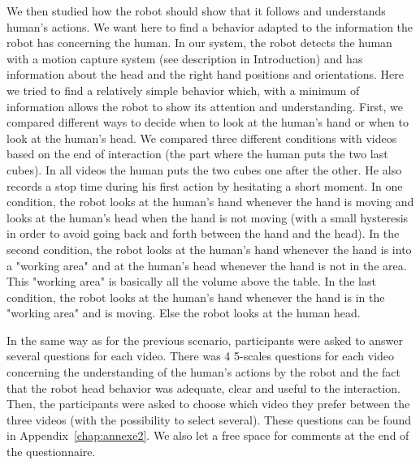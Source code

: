 \documentclass[english,a4paper,11pt,twoside]{StyleThese}
\begin{document}
We then studied how the robot should show that it follows and understands human's actions. We want here to find a behavior adapted to the information the robot has concerning the human. In our system, the robot detects the human with a motion capture system (see description in Introduction) and has information about the head and the right hand positions and orientations. Here we tried to find a relatively simple behavior which, with a minimum of information allows the robot to show its attention and understanding. First, we compared different ways to decide when to look at the human's hand or when to look at the human's head. We compared three different conditions with videos based on the end of interaction (the part where the human puts the two last cubes). In all videos the human puts the two cubes one after the other. He also records a stop time during his first action by hesitating a short moment. In one condition, the robot looks at the human's hand whenever the hand is moving and looks at the human's head when the hand is not moving (with a small hysteresis in order to avoid going back and forth between the hand and the head). In the second condition, the robot looks at the human's hand whenever the hand is into a "working area" and at the human's head whenever the hand is not in the area. This "working area" is basically all the volume above the table. In the last condition, the robot looks at the human's hand whenever the hand is in the "working area" and is moving. Else the robot looks at the human head.

In the same way as for the previous scenario, participants were asked to answer several questions for each video. There was 4 5-scales questions for each video concerning the understanding of the human's actions by the robot and the fact that the robot head behavior was adequate, clear and useful to the interaction. Then, the participants were asked to choose which video they prefer between the three videos (with the possibility to select several). These questions can be found in Appendix~\ref{chap:annexe2}. We also let a free space for comments at the end of the questionnaire.
\end{document}
